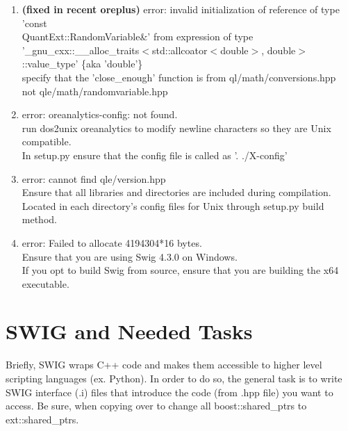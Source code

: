 \documentclass[10pt]{article}
\begin{document}
\begin{enumerate}
    \item \textbf{(fixed in recent oreplus)} error: invalid initialization of reference of type 'const \\ QuantExt::RandomVariable\&' from expression of type '\_gnu\_cxx::\_\_alloc\_traits$<$std::allcoator$<$double$>$, double$>$::value\_type' \{aka 'double'\} \\
    \-\hspace{1cm} specify that the 'close\_enough' function is from ql/math/conversions.hpp \\ \-\hspace{1cm} not qle/math/randomvariable.hpp \\

    \item error: oreanalytics-config: not found. \\
    \-\hspace{1cm} run dos2unix oreanalytics to modify newline characters so they are Unix compatible. \\ \-\hspace{1cm}In setup.py ensure that the config file is called as '. ./X-config' 

    \item error: cannot find qle/version.hpp \\
    \-\hspace{1cm} Ensure that all libraries and directories are included during compilation. \\ \-\hspace{1cm} Located in each directory's config files for Unix through setup.py build method.
    
    \item error: Failed to allocate 4194304*16 bytes. \\
    \-\hspace{1cm} Ensure that you are using Swig 4.3.0 on Windows. \\ \-\hspace{1cm} If you opt to build Swig from source, ensure that you are building the x64 executable.


\end{enumerate}

\pagebreak

\section*{SWIG and Needed Tasks}
Briefly, SWIG wraps C++ code and makes them accessible to higher level scripting languages (ex. Python). In order to do so, the general task is to write SWIG interface (.i) files that introduce the code (from .hpp file) you want to access. Be sure, when copying over to change all boost::shared\_ptrs to ext::shared\_ptrs.\\
\end{document}
